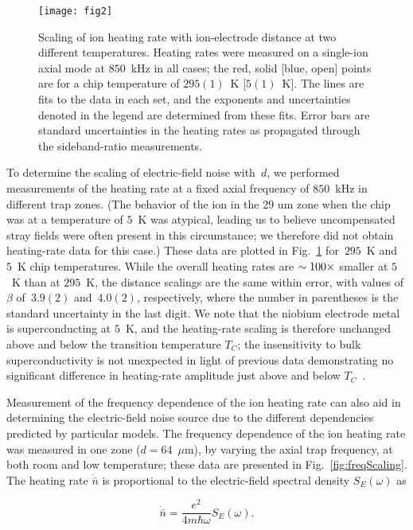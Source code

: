 \documentclass[reprint,twocolumn,prl,amsmath,amssymb,longbibliography,aps,superscriptaddress]{revtex4-1}
\begin{document}
\begin{figure}[t b !]
\texttt{[image: fig2]}
\caption{Scaling of ion heating rate with ion-electrode distance at two different temperatures.  Heating rates were measured on a single-ion axial mode at $850$~kHz in all cases; the red, solid [blue, open] points are for a chip temperature of $295(1)$~K [$5(1)$~K].  The lines are fits to the data in each set, and the exponents and uncertainties denoted in the legend are determined from these fits.  Error bars are standard uncertainties in the heating rates as propagated through the sideband-ratio measurements.}
\label{fig:distance_scaling}
\end{figure}

To determine the scaling of electric-field noise with~$d$, we performed measurements of the heating rate at a fixed axial frequency of $850$~kHz in different trap zones.  (The behavior of the ion in the 29 um zone when the chip was at a temperature of $5$~K was atypical, leading us to believe uncompensated stray fields were often present in this circumstance; we therefore did not obtain heating-rate data for this case.)  These data are plotted in Fig.~\ref{fig:distance_scaling} for~$295$~K and~$5$~K chip temperatures.  While the overall heating rates are $\sim\nobreak100\times$ smaller at $5$~K than at $295$~K, the distance scalings are the same within error, with values of $\beta$ of~$3.9(2)$ and~$4.0(2)$, respectively, where the number in parentheses is the standard uncertainty in the last digit.  We note that the niobium electrode metal is superconducting at $5$~K, and the heating-rate scaling is therefore unchanged above and below the transition temperature $T_{C}$; the insensitivity to bulk superconductivity is not unexpected in light of previous data demonstrating no significant difference in heating-rate amplitude just above and below $T_{C}$~\cite{Wang2010,Chiaverini2014}.


Measurement of the frequency dependence of the ion heating rate can also aid in determining the electric-field noise source due to the different dependencies predicted by particular models.  The frequency dependence of the ion heating rate was measured in one zone ($d=64$~$\mu$m), by varying the axial trap frequency, at both room and low temperature; these data are presented in Fig.~\ref{fig:freqScaling}.  The heating rate $\dot{\bar{n}}$ is proportional to the electric-field spectral density $S_{E}(\omega)$ as

\begin{equation}
\dot{\bar{n}} = \frac{e^{2}}{4 m \hbar \omega}S_{E}(\omega).
\label{equation_heating}
\end{equation}
\end{document}
